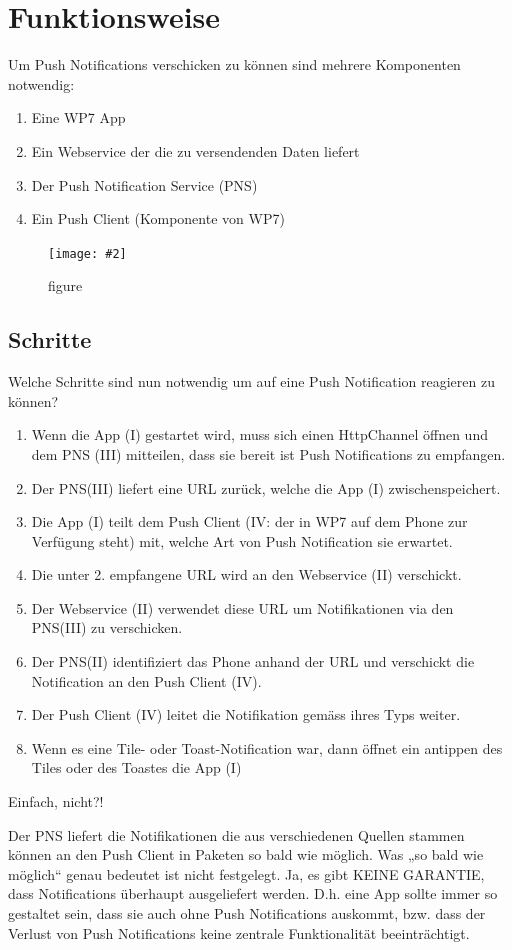 \documentclass[a4paper,10pt]{scrreprt}
\newcommand{\pic}[2][figure]{\begin{figure}[h]
 \centering
 \texttt{[image: \#2]}
 \caption{#1}
\end{figure}
}
\begin{document}
\section{Funktionsweise}
Um Push Notifications verschicken zu können sind mehrere Komponenten notwendig:
\begin{enumerate}
\item Eine WP7 App
\item Ein Webservice der die zu versendenden Daten liefert
\item Der Push Notification Service (PNS)
\item Ein Push Client (Komponente von WP7)
\end{enumerate}

\pic{drawing.png}

\subsection{Schritte}
Welche Schritte sind nun notwendig um auf eine Push Notification reagieren zu können?
\begin{enumerate}


\item Wenn die App (I) gestartet wird, muss sich einen HttpChannel öffnen und dem PNS (III) mitteilen, dass
sie bereit ist Push Notifications zu empfangen.
\item Der PNS(III) liefert eine URL zurück, welche die App (I) zwischenspeichert.
\item Die App (I) teilt dem Push Client (IV: der in WP7 auf dem Phone zur Verfügung steht) mit, welche Art
von Push Notification sie erwartet.
\item Die unter 2. empfangene URL wird an den Webservice (II) verschickt.
\item Der Webservice (II) verwendet diese URL um Notifikationen via den PNS(III) zu verschicken.
\item Der PNS(II) identifiziert das Phone anhand der URL und verschickt die Notification an den Push Client
(IV).
\item Der Push Client (IV) leitet die Notifikation gemäss ihres Typs weiter.
\item Wenn es eine Tile- oder Toast-Notification war, dann öffnet ein antippen des Tiles oder des Toastes die
App (I)
\end{enumerate}
Einfach, nicht?!

Der PNS liefert die Notifikationen die aus verschiedenen Quellen stammen können an den Push Client in
Paketen so bald wie möglich. Was „so bald wie möglich“ genau bedeutet ist nicht festgelegt. Ja, es gibt KEINE
GARANTIE, dass Notifications überhaupt ausgeliefert werden. D.h. eine App sollte immer so gestaltet sein, dass
sie auch ohne Push Notifications auskommt, bzw. dass der Verlust von Push Notifications keine zentrale
Funktionalität beeinträchtigt.
\end{document}
